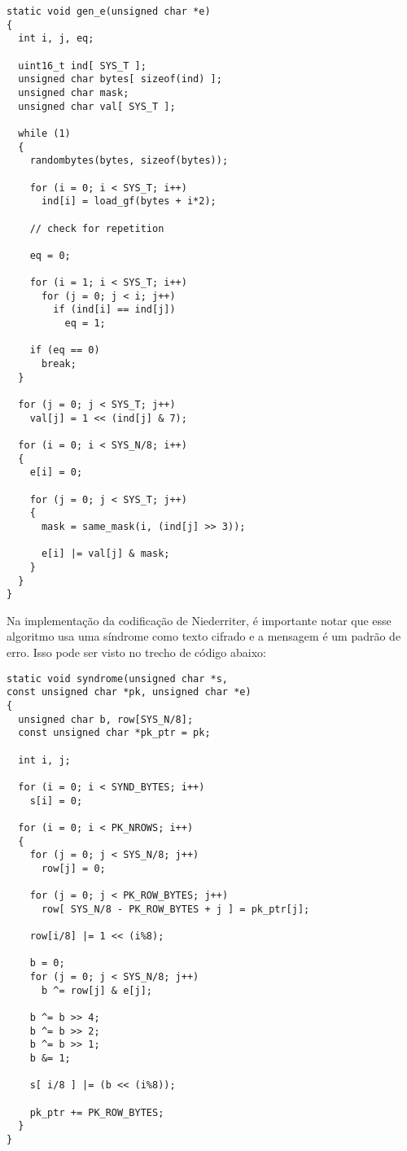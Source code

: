 \begin{verbatim}
static void gen_e(unsigned char *e)
{
  int i, j, eq;

  uint16_t ind[ SYS_T ];
  unsigned char bytes[ sizeof(ind) ];
  unsigned char mask;  
  unsigned char val[ SYS_T ];  

  while (1)
  {
    randombytes(bytes, sizeof(bytes));

    for (i = 0; i < SYS_T; i++)
      ind[i] = load_gf(bytes + i*2);

    // check for repetition

    eq = 0;

    for (i = 1; i < SYS_T; i++) 
      for (j = 0; j < i; j++)
        if (ind[i] == ind[j]) 
          eq = 1;

    if (eq == 0)
      break;
  }

  for (j = 0; j < SYS_T; j++)
    val[j] = 1 << (ind[j] & 7);

  for (i = 0; i < SYS_N/8; i++) 
  {
    e[i] = 0;

    for (j = 0; j < SYS_T; j++)
    {
      mask = same_mask(i, (ind[j] >> 3));

      e[i] |= val[j] & mask;
    }
  }
}
\end{verbatim}

Na implementação da codificação de Niederriter, é importante notar que esse algoritmo usa uma síndrome como texto cifrado e a mensagem é um padrão de erro. Isso pode ser visto no trecho de código abaixo:

\begin{verbatim}
static void syndrome(unsigned char *s, 
const unsigned char *pk, unsigned char *e)
{
  unsigned char b, row[SYS_N/8];
  const unsigned char *pk_ptr = pk;

  int i, j;

  for (i = 0; i < SYND_BYTES; i++)
    s[i] = 0;

  for (i = 0; i < PK_NROWS; i++)  
  {
    for (j = 0; j < SYS_N/8; j++) 
      row[j] = 0;

    for (j = 0; j < PK_ROW_BYTES; j++) 
      row[ SYS_N/8 - PK_ROW_BYTES + j ] = pk_ptr[j];

    row[i/8] |= 1 << (i%8);
    
    b = 0;
    for (j = 0; j < SYS_N/8; j++)
      b ^= row[j] & e[j];

    b ^= b >> 4;
    b ^= b >> 2;
    b ^= b >> 1;
    b &= 1;

    s[ i/8 ] |= (b << (i%8));

    pk_ptr += PK_ROW_BYTES;
  }
}
\end{verbatim}

